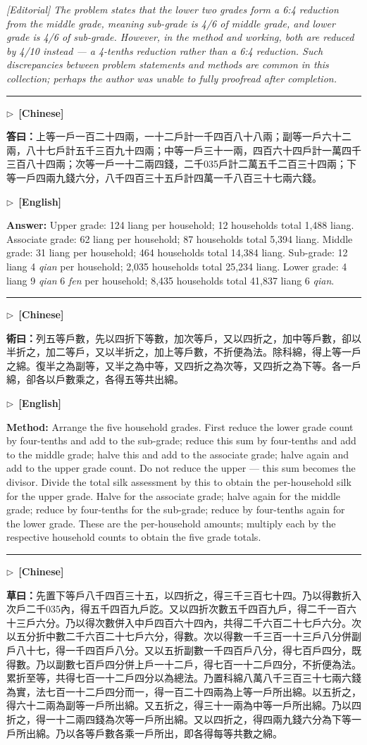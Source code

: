 \documentclass[10pt,a4paper]{article}
\newcommand{\longline}{\par\noindent\rule{\textwidth}{0.4pt}\par}
\newcommand{\CNmarker}{\noindent\textcolor{cnlabel}{$\triangleright$\ \textbf{[Chinese]}}\par}
\newcommand{\ENmarker}{\noindent\textcolor{enlabel}{$\triangleright$\ \textbf{[English]}}\par}
\newcommand{\Answer}[1]{\par\noindent\textbf{\color{answercolor}答曰：}#1\par}
\newcommand{\Method}[1]{\par\noindent\textbf{\color{methodcolor}術曰：}#1\par}
\newcommand{\Working}[1]{\par\noindent\textbf{\color{workingcolor}草曰：}#1\par}
\newcommand{\AnswerEn}[1]{\par\noindent\textbf{\color{answercolor}Answer:} #1\par}
\newcommand{\MethodEn}[1]{\par\noindent\textbf{\color{methodcolor}Method:} #1\par}
\newcommand{\EditorialNoteEn}[1]{\par\noindent\textit{[Editorial] #1}\par}
\begin{document}
\EditorialNoteEn{The problem states that the lower two grades form a 6:4 reduction from the middle grade, meaning sub-grade is 4/6 of middle grade, and lower grade is 4/6 of sub-grade. However, in the method and working, both are reduced by 4/10 instead --- a 4-tenths reduction rather than a 6:4 reduction. Such discrepancies between problem statements and methods are common in this collection; perhaps the author was unable to fully proofread after completion.}

\longline

\CNmarker
\Answer{上等一戶一百二十四兩，一十二戶計一千四百八十八兩；副等一戶六十二兩，八十七戶計五千三百九十四兩；中等一戶三十一兩，四百六十四戶計一萬四千三百八十四兩；次等一戶一十二兩四錢，二千035戶計二萬五千二百三十四兩；下等一戶四兩九錢六分，八千四百三十五戶計四萬一千八百三十七兩六錢。}

\ENmarker
\AnswerEn{Upper grade: 124 liang per household; 12 households total 1,488 liang. Associate grade: 62 liang per household; 87 households total 5,394 liang. Middle grade: 31 liang per household; 464 households total 14,384 liang. Sub-grade: 12 liang 4 \textit{qian} per household; 2,035 households total 25,234 liang. Lower grade: 4 liang 9 \textit{qian} 6 \textit{fen} per household; 8,435 households total 41,837 liang 6 \textit{qian}.}

\longline

\CNmarker
\Method{列五等戶數，先以四折下等數，加次等戶，又以四折之，加中等戶數，卻以半折之，加二等戶，又以半折之，加上等戶數，不折便為法。除科綿，得上等一戶之綿。復半之為副等，又半之為中等，又四折之為次等，又四折之為下等。各一戶綿，卻各以戶數乘之，各得五等共出綿。}

\ENmarker
\MethodEn{Arrange the five household grades. First reduce the lower grade count by four-tenths and add to the sub-grade; reduce this sum by four-tenths and add to the middle grade; halve this and add to the associate grade; halve again and add to the upper grade count. Do not reduce the upper --- this sum becomes the divisor. Divide the total silk assessment by this to obtain the per-household silk for the upper grade. Halve for the associate grade; halve again for the middle grade; reduce by four-tenths for the sub-grade; reduce by four-tenths again for the lower grade. These are the per-household amounts; multiply each by the respective household counts to obtain the five grade totals.}

\longline

\CNmarker
\Working{先置下等戶八千四百三十五，以四折之，得三千三百七十四。乃以得數折入次戶二千035內，得五千四百九戶訖。又以四折次數五千四百九戶，得二千一百六十三戶六分。乃以得次數併入中戶四百六十四內，共得二千六百二十七戶六分。次以五分折中數二千六百二十七戶六分，得數。次以得數一千三百一十三戶八分併副戶八十七，得一千四百戶八分。又以五折副數一千四百戶八分，得七百戶四分，既得數。乃以副數七百戶四分併上戶一十二戶，得七百一十二戶四分，不折便為法。累折至等，共得七百一十二戶四分以為總法。乃置科綿八萬八千三百三十七兩六錢為實，法七百一十二戶四分而一，得一百二十四兩為上等一戶所出綿。以五折之，得六十二兩為副等一戶所出綿。又五折之，得三十一兩為中等一戶所出綿。乃以四折之，得一十二兩四錢為次等一戶所出綿。又以四折之，得四兩九錢六分為下等一戶所出綿。乃以各等戶數各乘一戶所出，即各得每等共數之綿。}
\end{document}
